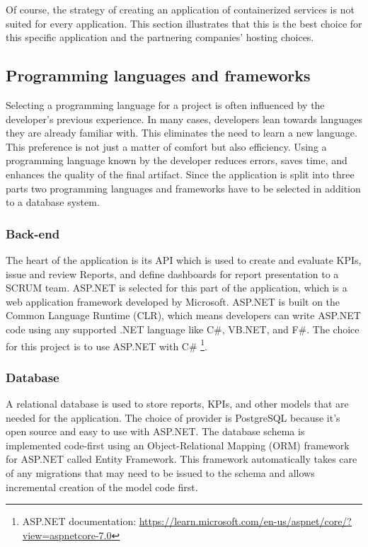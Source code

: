 Of course, the strategy of creating an application of containerized services is not suited for every application. 
This section illustrates that this is the best choice for this specific application and the partnering companies' hosting choices.

\subsection{Programming languages and frameworks}

Selecting a programming language for a project is often influenced by the developer's previous experience. 
In many cases, developers lean towards languages they are already familiar with. 
This eliminates the need to learn a new language. 
This preference is not just a matter of comfort but also efficiency. 
Using a programming language known by the developer reduces errors, saves time,
and enhances the quality of the final artifact. 
Since the application is split into three parts two programming languages and frameworks have to be selected in addition to a database system.


\subsubsection{Back-end}

The heart of the application is its API which is used to create and evaluate KPIs, 
issue and review Reports, and define dashboards for report presentation to a SCRUM team. 
ASP.NET is selected for this part of the application, 
which is a web application framework developed by Microsoft. 
ASP.NET is built on the Common Language Runtime (CLR), 
which means developers can write ASP.NET code using any supported .NET language like C\#, 
VB.NET, and F\#. The choice for this project is to use ASP.NET with C\# \footnote{ASP.NET documentation: \url{https://learn.microsoft.com/en-us/aspnet/core/?view=aspnetcore-7.0}}.

\subsubsection{Database}

A relational database is used to store reports, 
KPIs, and other models that are needed for the application. 
The choice of provider is PostgreSQL because it's open source and easy to use with ASP.NET. 
The database schema is implemented code-first using an Object-Relational Mapping (ORM) framework for ASP.NET called Entity Framework. 
This framework automatically takes care of any migrations that may need to be issued to the schema and allows incremental creation of the model code first.

